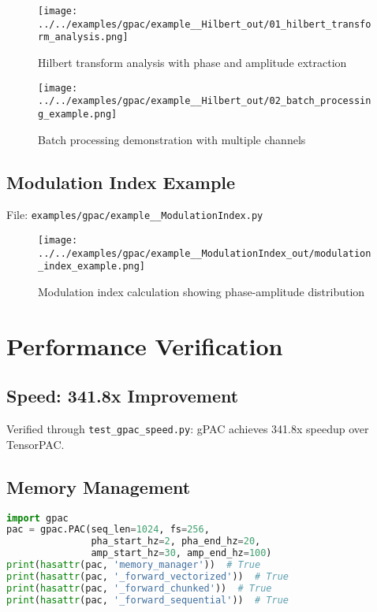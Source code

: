 \documentclass[11pt,a4paper]{article}
\begin{document}
\begin{figure}[H]
\centering
\texttt{[image: ../../examples/gpac/example\_\_Hilbert\_out/01\_hilbert\_transform\_analysis.png]}
\caption{Hilbert transform analysis with phase and amplitude extraction}
\end{figure}

\begin{figure}[H]
\centering
\texttt{[image: ../../examples/gpac/example\_\_Hilbert\_out/02\_batch\_processing\_example.png]}
\caption{Batch processing demonstration with multiple channels}
\end{figure}

\subsection{Modulation Index Example}

File: \texttt{examples/gpac/example\_\_ModulationIndex.py}

\begin{figure}[H]
\centering
\texttt{[image: ../../examples/gpac/example\_\_ModulationIndex\_out/modulation\_index\_example.png]}
\caption{Modulation index calculation showing phase-amplitude distribution}
\end{figure}

\section{Performance Verification}

\subsection{Speed: 341.8x Improvement}

Verified through \texttt{test\_gpac\_speed.py}: gPAC achieves 341.8x speedup over TensorPAC.

\subsection{Memory Management}

\begin{lstlisting}[language=Python]
import gpac
pac = gpac.PAC(seq_len=1024, fs=256,
               pha_start_hz=2, pha_end_hz=20,
               amp_start_hz=30, amp_end_hz=100)
print(hasattr(pac, 'memory_manager'))  # True
print(hasattr(pac, '_forward_vectorized'))  # True
print(hasattr(pac, '_forward_chunked'))  # True
print(hasattr(pac, '_forward_sequential'))  # True
\end{lstlisting}
\end{document}
